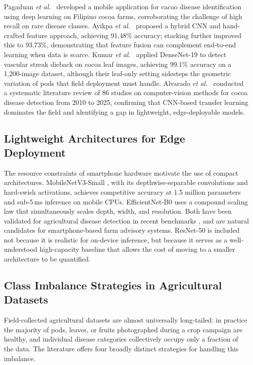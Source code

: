 \documentclass[conference,10pt]{IEEEtran}
\begin{document}
Pagaduan \emph{et al.}~\cite{pagaduan2026} developed a mobile application for
cacao disease identification using deep learning on Filipino cocoa farms,
corroborating the challenge of high recall on rare disease classes.
Ayikpa \emph{et al.}~\cite{ayikpa2025} proposed a hybrid CNN and hand-crafted
feature approach, achieving 91.48\% accuracy; stacking further improved this
to 93.73\%, demonstrating that feature fusion can complement end-to-end
learning when data is scarce. Kumar \emph{et al.}~\cite{kumar2023} applied
DenseNet-19 to detect vascular streak dieback on cocoa leaf images, achieving
99.1\% accuracy on a 1{,}200-image dataset, although their leaf-only setting
sidesteps the geometric variation of pods that field deployment must handle.
Alvarado \emph{et al.}~\cite{alvarado2025} conducted a systematic literature
review of 86 studies on computer-vision methods for cocoa disease detection
from 2010 to 2025, confirming that CNN-based transfer learning dominates the
field and identifying a gap in lightweight, edge-deployable models.

\subsection{Lightweight Architectures for Edge Deployment}

The resource constraints of smartphone hardware motivate the use of compact
architectures. MobileNetV3-Small \cite{howard2019}, with its
depthwise-separable convolutions and hard-swish activations, achieves
competitive accuracy at 1.5 million parameters and sub-5\,ms inference on
mobile CPUs. EfficientNet-B0 \cite{tan2019} uses a compound scaling law that
simultaneously scales depth, width, and resolution. Both have been validated
for agricultural disease detection in recent benchmarks \cite{edgeai2024},
and are natural candidates for smartphone-based farm advisory systems.
ResNet-50 \cite{he2016} is included not because it is realistic for on-device
inference, but because it serves as a well-understood high-capacity baseline
that allows the cost of moving to a smaller architecture to be quantified.

\subsection{Class Imbalance Strategies in Agricultural Datasets}

Field-collected agricultural datasets are almost universally long-tailed: in
practice the majority of pods, leaves, or fruits photographed during a crop
campaign are healthy, and individual disease categories collectively occupy
only a fraction of the data. The literature offers four broadly distinct
strategies for handling this imbalance.
\end{document}
